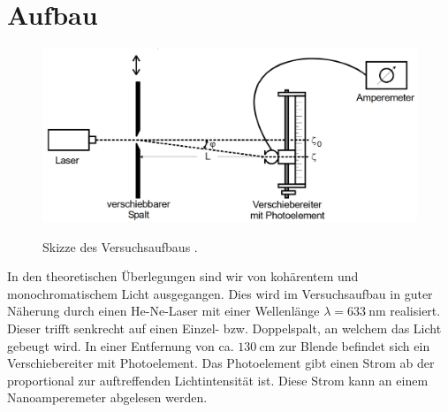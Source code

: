 \section{Aufbau}
\label{sec:Aufbau}
\begin{figure}
	\centering
	\caption{Skizze des Versuchsaufbaus \cite{V406}.}
	\includegraphics[width=\linewidth-150pt,height=\textheight-150pt,keepaspectratio]{content/images/Aufbau.png}
	\label{fig:Aufbau}
\end{figure}
In den theoretischen Überlegungen sind wir von kohärentem und monochromatischem Licht ausgegangen. Dies wird im Versuchsaufbau in guter Näherung durch einen He-Ne-Laser mit einer Wellenlänge $\lambda = \SI{633}{\nano\meter}$ realisiert. Dieser trifft senkrecht auf einen Einzel- bzw. Doppelspalt, an welchem das Licht gebeugt wird. In einer Entfernung von ca. $\SI{130}{\centi\meter}$ zur Blende befindet sich ein Verschiebereiter mit Photoelement. Das Photoelement gibt einen Strom ab der proportional zur auftreffenden Lichtintensität ist. Diese Strom kann an einem Nanoamperemeter abgelesen werden.